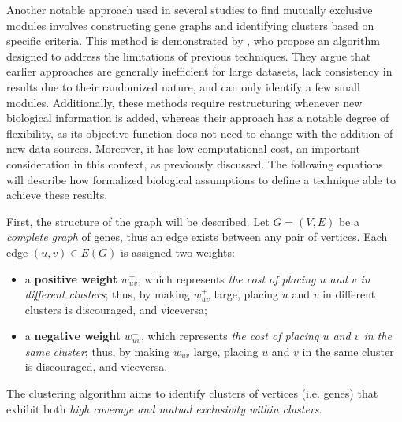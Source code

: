 Another notable approach used in several studies to find mutually exclusive modules involves constructing gene graphs and identifying clusters based on specific criteria. This method is demonstrated by \textcite{c3}, who propose an algorithm designed to address the limitations of previous techniques. They argue that earlier approaches are generally inefficient for large datasets, lack consistency in results due to their randomized nature, and can only identify a few small modules. Additionally, these methods require restructuring whenever new biological information is added, whereas their approach has a notable degree of flexibility, as its objective function does not need to change with the addition of new data sources. Moreover, it has low computational cost, an important consideration in this context, as previously discussed. The following equations will describe how \textcite{c3} formalized biological assumptions to define a technique able to achieve these results.

First, the structure of the graph will be described. Let $G = (V, E)$ be a \textit{complete graph} of genes, thus an edge exists between any pair of vertices. Each edge $(u, v) \in E(G)$ is assigned two weights:

\begin{itemize}
    \item a \textbf{positive weight} $w_{uv}^+$, which represents \textit{the cost of placing $u$ and $v$ in different clusters}; thus, by making $w_{uv}^+$ large, placing $u$ and $v$ in different clusters is discouraged, and viceversa;
    \item a \textbf{negative weight} $w_{uv}^-$, which represents \textit{the cost of placing $u$ and $v$ in the same cluster}; thus, by making $w_{uv}^-$ large, placing $u$ and $v$ in the same cluster is discouraged, and viceversa.
\end{itemize}

The clustering algorithm aims to identify clusters of vertices (i.e. genes) that exhibit both \textit{high coverage and mutual exclusivity within clusters}.


